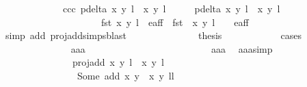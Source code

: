 \begin{isabellebody}
\ \ \ \ \ \ \ \ \ \ \ \ {\isacharparenleft}ccc{\isacharparenright}\ {\isachardoublequoteopen}p{\isacharunderscore}delta\ {\isacharparenleft}{\isacharparenleft}x{\isacharcomma}\ y{\isacharparenright}{\isacharcomma}\ l{\isacharparenright}\ {\isacharparenleft}{\isasymtau}\ {\isacharparenleft}x{\isacharprime}{\isacharcomma}\ y{\isacharprime}{\isacharparenright}{\isacharcomma}\ l{\isacharprime}\ {\isacharplus}\ {}{\isacharparenright}\ {\isacharequal}\ {}\ {\isasymand}\ p{\isacharunderscore}delta{\isacharprime}\ {\isacharparenleft}{\isacharparenleft}x{\isacharcomma}\ y{\isacharparenright}{\isacharcomma}\ l{\isacharparenright}\ {\isacharparenleft}{\isasymtau}\ {\isacharparenleft}x{\isacharprime}{\isacharcomma}\ y{\isacharprime}{\isacharparenright}{\isacharcomma}\ l{\isacharprime}\ {\isacharplus}\ {}{\isacharparenright}\ {\isacharequal}\ {}\isanewline
\ \ \ \ \ \ \ \ \ \ \ \ \ \ \ \ \ \ \ {\isasymor}\ fst\ {\isacharparenleft}{\isacharparenleft}x{\isacharcomma}\ y{\isacharparenright}{\isacharcomma}\ l{\isacharparenright}\ {\isasymnotin}\ e{\isacharunderscore}aff\ {\isasymor}\ fst\ {\isacharparenleft}{\isasymtau}\ {\isacharparenleft}x{\isacharprime}{\isacharcomma}\ y{\isacharprime}{\isacharparenright}{\isacharcomma}\ l{\isacharprime}\ {\isacharplus}\ {}{\isacharparenright}\ {\isasymnotin}\ e{\isacharunderscore}aff{\isachardoublequoteclose}\ \isanewline
\ \ \ \ \ \ \ \ \ \ \ \ \ \ \isamarkupfalse%
{\isacharparenleft}simp\ add{\isacharcolon}\ proj{\isacharunderscore}add{\isachardot}simps{\isacharcomma}blast{\isacharparenright}\ \isanewline
\ \ \ \ \ \ \ \ \ \ \isamarkupfalse%
\ \isamarkupfalse%
\ {\isacharquery}thesis\ \isanewline
\ \ \ \ \ \ \ \ \ \ \isamarkupfalse%
{\isacharparenleft}cases{\isacharparenright}\isanewline
\ \ \ \ \ \ \ \ \ \ \ \ \isamarkupfalse%
\ aaa\ \ \ \ \ \ \ \ \ \ \ \ \isanewline
\ \ \ \ \ \ \ \ \ \ \ \ \isamarkupfalse%
\ aaa\ \isamarkupfalse%
\ aaa{\isacharunderscore}simp{\isacharcolon}\ \isanewline
\ \ \ \ \ \ \ \ \ \ \ \ \ \ {\isachardoublequoteopen}proj{\isacharunderscore}add\ {\isacharparenleft}{\isacharparenleft}x{\isacharcomma}\ y{\isacharparenright}{\isacharcomma}\ l{\isacharparenright}\ {\isacharparenleft}{\isasymtau}\ {\isacharparenleft}x{\isacharprime}{\isacharcomma}\ y{\isacharprime}{\isacharparenright}{\isacharcomma}\ l{\isacharprime}\ {\isacharplus}\ {}{\isacharparenright}\ {\isacharequal}\ \isanewline
\ \ \ \ \ \ \ \ \ \ \ \ \ \ \ Some\ {\isacharparenleft}add\ {\isacharparenleft}x{\isacharcomma}\ y{\isacharparenright}\ {\isacharparenleft}{\isasymtau}\ {\isacharparenleft}x{\isacharprime}{\isacharcomma}\ y{\isacharprime}{\isacharparenright}{\isacharparenright}{\isacharcomma}\ l{\isacharplus}l{\isacharprime}{\isacharplus}{}{\isacharparenright}{\isachardoublequoteclose}\ \isanewline

\end{isabellebody}
